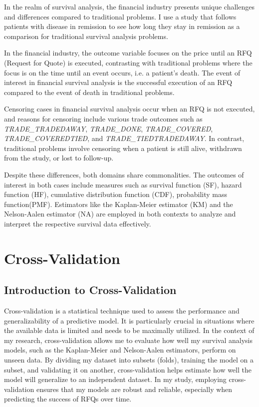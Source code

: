 In the realm of survival analysis, the financial industry presents unique challenges and differences compared to traditional problems. I use a study that follows patients with disease in remission to see how long they stay in remission as a comparison for traditional survival analysis problems. 

In the financial industry, the outcome variable focuses on the price until an RFQ (Request for Quote) is executed, contrasting with traditional problems where the focus is on the time until an event occurs, i.e. a patient's death. The event of interest in financial survival analysis is the successful execution of an RFQ compared to the event of death in traditional problems.

Censoring cases in financial survival analysis occur when an RFQ is not executed, and reasons for censoring include various trade outcomes such as \textit{TRADE\_TRADEDAWAY}, \textit{TRADE\_DONE}, \textit{TRADE\_COVERED}, \textit{TRADE\_COVEREDTIED}, and \textit{TRADE\_TIEDTRADEDAWAY}. In contrast, traditional problems involve censoring when a patient is still alive, withdrawn from the study, or lost to follow-up.

Despite these differences, both domains share commonalities. The outcomes of interest in both cases include measures such as survival function (SF), hazard function (HF), cumulative distribution function (CDF), probability mass function(PMF). Estimators like the Kaplan-Meier estimator (KM) and the Nelson-Aalen estimator (NA) are employed in both contexts to analyze and interpret the respective survival data effectively.

\section{Cross-Validation}
\subsection{Introduction to Cross-Validation}
Cross-validation is a statistical technique used to assess the performance and generalizability of a predictive model. It is particularly crucial in situations where the available data is limited and needs to be maximally utilized. In the context of my research, cross-validation allows me to evaluate how well my survival analysis models, such as the Kaplan-Meier and Nelson-Aalen estimators, perform on unseen data. By dividing my dataset into subsets (folds), training the model on a subset, and validating it on another, cross-validation helps estimate how well the model will generalize to an independent dataset. In my study, employing cross-validation ensures that my models are robust and reliable, especially when predicting the success of RFQs over time.

